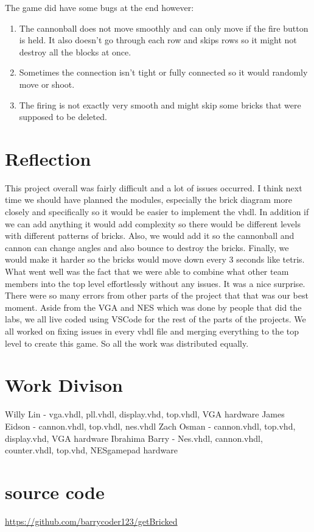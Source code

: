 \documentclass[12pt]{article}
\begin{document}
\begin{flushleft}
The game did have some bugs at the end however:\\
\begin{enumerate}
    \item The cannonball does not move smoothly and can only move if the fire
button is held. It also doesn’t go through each row and skips rows so it might
not destroy all the blocks at once. 
    \item Sometimes the connection isn’t tight or fully connected so it would randomly move or shoot.
    \item The firing is not exactly very smooth and might skip some bricks that
were supposed to be deleted.
\end{enumerate}

\section{Reflection} 
This project overall was fairly difficult and a lot of issues occurred. I think
next time we should have planned the modules, especially the brick diagram more
closely and specifically so it would be easier to implement the vhdl. In
addition if we can add anything it would add complexity so there would be
different levels with different patterns of bricks. Also, we would add it so the
cannonball and cannon can change angles and also bounce to destroy the bricks.
Finally, we would make it harder so the bricks would move down every 3 seconds
like tetris. What went well was the fact that we were able to combine what other
team members into the top level effortlessly without any issues. It was a nice
surprise. There were so many errors from other parts of the project that that
was our best moment. Aside from the VGA and NES which was done by people that
did the labs, we all live coded using VSCode for the rest of the parts of the
projects. We all worked on fixing issues in every vhdl file and merging
everything to the top level to create this game. So all the work was distributed
equally.

\section{Work Divison} 
Willy Lin - vga.vhdl, pll.vhdl, display.vhd, top.vhdl, VGA hardware
James Eidson - cannon.vhdl, top.vhdl, nes.vhdl
Zach Osman - cannon.vhdl, top.vhd, display.vhd, VGA hardware
Ibrahima Barry - Nes.vhdl, cannon.vhdl, counter.vhdl, top.vhd, NESgamepad hardware
\section{source code}
\url{https://github.com/barrycoder123/getBricked}

\end{flushleft}
\end{document}
